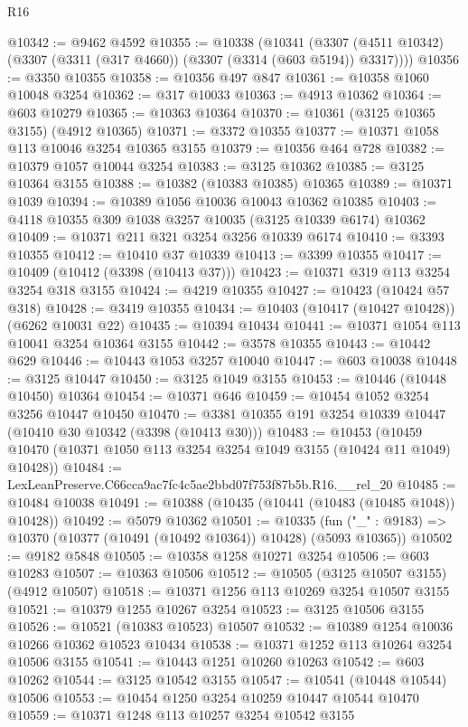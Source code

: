 \begin{lexlean}{R16}
\begin{coremodule}
@10342 := @9462 @4592
@10355 := @10338
    (@10341 (@3307 (@4511 @10342) (@3307 (@3311 (@317 @4660)) (@3307 (@3314 (@603 @5194)) @3317))))
@10356 := @3350 @10355
@10358 := @10356 @497 @847
@10361 := @10358 @1060 @10048 @3254
@10362 := @317 @10033
@10363 := @4913 @10362
@10364 := @603 @10279
@10365 := @10363 @10364
@10370 := @10361 (@3125 @10365 @3155) (@4912 @10365)
@10371 := @3372 @10355
@10377 := @10371 @1058 @113 @10046 @3254 @10365 @3155
@10379 := @10356 @464 @728
@10382 := @10379 @1057 @10044 @3254
@10383 := @3125 @10362
@10385 := @3125 @10364 @3155
@10388 := @10382 (@10383 @10385) @10365
@10389 := @10371 @1039
@10394 := @10389 @1056 @10036 @10043 @10362 @10385
@10403 := @4118 @10355 @309 @1038 @3257 @10035 (@3125 @10339 @6174) @10362
@10409 := @10371 @211 @321 @3254 @3256 @10339 @6174
@10410 := @3393 @10355
@10412 := @10410 @37 @10339
@10413 := @3399 @10355
@10417 := @10409 (@10412 (@3398 (@10413 @37)))
@10423 := @10371 @319 @113 @3254 @3254 @318 @3155
@10424 := @4219 @10355
@10427 := @10423 (@10424 @57 @318)
@10428 := @3419 @10355
@10434 := @10403 (@10417 (@10427 @10428)) (@6262 @10031 @22)
@10435 := @10394 @10434
@10441 := @10371 @1054 @113 @10041 @3254 @10364 @3155
@10442 := @3578 @10355
@10443 := @10442 @629
@10446 := @10443 @1053 @3257 @10040
@10447 := @603 @10038
@10448 := @3125 @10447
@10450 := @3125 @1049 @3155
@10453 := @10446 (@10448 @10450) @10364
@10454 := @10371 @646
@10459 := @10454 @1052 @3254 @3256 @10447 @10450
@10470 := @3381 @10355 @191 @3254 @10339 @10447 (@10410 @30 @10342 (@3398 (@10413 @30)))
@10483 := @10453
    (@10459 @10470 (@10371 @1050 @113 @3254 @3254 @1049 @3155 (@10424 @11 @1049) @10428))
@10484 := LexLeanPreserve.C66cca9ac7fc4c5ae2bbd07f753f87b5b.R16.__rel_20
@10485 := @10484 @10038
@10491 := @10388 (@10435 (@10441 (@10483 (@10485 @1048)) @10428))
@10492 := @5079 @10362
@10501 := @10335
    (fun ("_" : @9183) => @10370 (@10377 (@10491 (@10492 @10364)) @10428) (@5093 @10365))
@10502 := @9182 @5848
@10505 := @10358 @1258 @10271 @3254
@10506 := @603 @10283
@10507 := @10363 @10506
@10512 := @10505 (@3125 @10507 @3155) (@4912 @10507)
@10518 := @10371 @1256 @113 @10269 @3254 @10507 @3155
@10521 := @10379 @1255 @10267 @3254
@10523 := @3125 @10506 @3155
@10526 := @10521 (@10383 @10523) @10507
@10532 := @10389 @1254 @10036 @10266 @10362 @10523 @10434
@10538 := @10371 @1252 @113 @10264 @3254 @10506 @3155
@10541 := @10443 @1251 @10260 @10263
@10542 := @603 @10262
@10544 := @3125 @10542 @3155
@10547 := @10541 (@10448 @10544) @10506
@10553 := @10454 @1250 @3254 @10259 @10447 @10544 @10470
@10559 := @10371 @1248 @113 @10257 @3254 @10542 @3155

\end{coremodule}
\end{lexlean}
